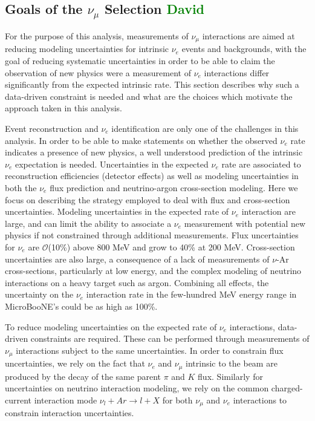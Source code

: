 \documentclass[a4paper]{article}
\begin{document}
\subsection{Goals of the $\nu_{\mu}$ Selection \textcolor{green}{David}}
\par For the purpose of this analysis, measurements of $\nu_{\mu}$ interactions are aimed at reducing modeling uncertainties for intrinsic $\nu_e$ events and backgrounds, with the goal of reducing systematic uncertainties in order to be able to claim the observation of new physics were a measurement of $\nu_e$ interactions differ significantly from the expected intrinsic rate. This section describes why such a data-driven constraint is needed and what are the choices which motivate the approach taken in this analysis.
\par Event reconstruction and $\nu_e$ identification are only one of the challenges in this analysis. In order to be able to make statements on whether the observed $\nu_e$ rate indicates a presence of new physics, a well understood prediction of the intrinsic $\nu_e$ expectation is needed. Uncertainties in the expected $\nu_e$ rate are associated to reconstruction efficiencies (detector effects) as well as modeling uncertainties in both the $\nu_e$ flux prediction and neutrino-argon cross-section modeling. Here we focus on describing the strategy employed to deal with flux and cross-section uncertainties. Modeling uncertainties in the expected rate of $\nu_e$ interaction are large, and can limit the ability to associate a $\nu_e$ measurement with potential new physics if not constrained through additional measurements. Flux uncertainties for $\nu_e$ are $\mathcal{O}$(10\%) above 800 MeV and grow to 40\% at 200 MeV. Cross-section uncertainties are also large, a consequence of a lack of measurements of $\nu$-Ar cross-sections, particularly at low energy, and the complex modeling of neutrino interactions on a heavy target such as argon. Combining all effects, the uncertainty on the $\nu_e$ interaction rate in the few-hundred MeV energy range in MicroBooNE's could be as high as 100\%.
\par To reduce modeling uncertainties on the expected rate of $\nu_e$ interactions, data-driven constraints are required. These can be performed through measurements of $\nu_{\mu}$ interactions subject to the same uncertainties. In order to constrain flux uncertainties, we rely on the fact that $\nu_e$ and $\nu_{\mu}$ intrinsic to the beam are produced by the decay of the same parent $\pi$ and $K$ flux. Similarly for uncertainties on neutrino interaction modeling, we rely on the common charged-current interaction mode $\nu_{l} + Ar \rightarrow l + X$ for both $\nu_{\mu}$ and $\nu_e$ interactions to constrain interaction uncertainties. 
\end{document}
